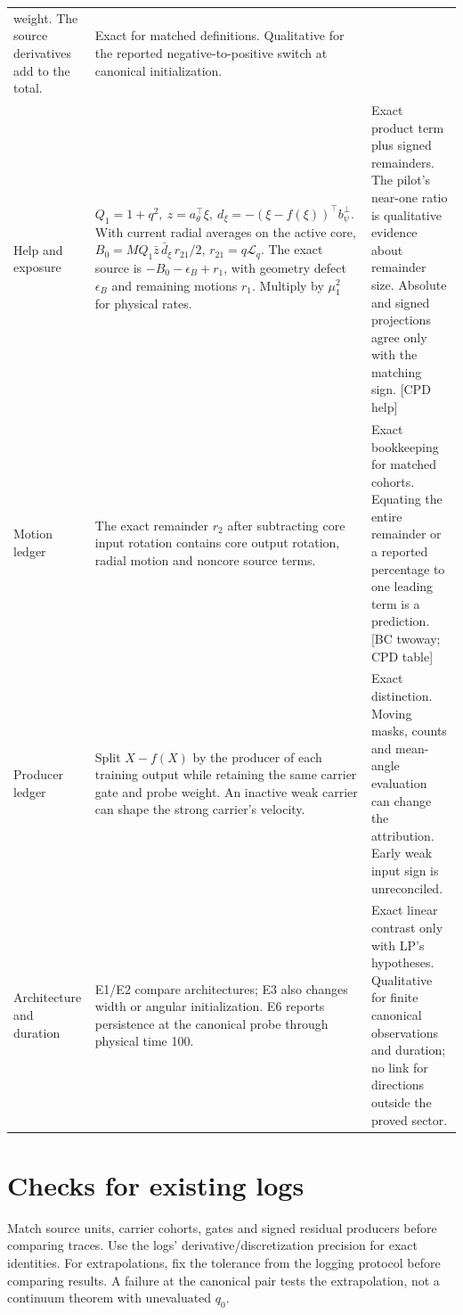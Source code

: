 \documentclass[10pt,twocolumn]{article}
\newcommand{\src}[1]{\textnormal{\small [#1]}}
\begin{document}
\begin{longtable}{@{}>{\raggedright\arraybackslash}p{}
 >{\raggedright\arraybackslash}p{}
 >{\raggedright\arraybackslash}p{}@{}}
weight. The source derivatives add to the total.
& Exact for matched definitions. Qualitative for the reported
negative-to-positive switch at canonical initialization.\\
Help and exposure & \(Q_1=1+q^2,\ z=a_\theta^\top\xi,\ 
d_\xi=-(\xi-f(\xi))^\top b_\psi^\perp\).
With current radial averages on the active core,
\(B_0=M Q_1\bar z\,\bar d_\xi\,r_{21}/2\), \(r_{21}=q\mathcal L_q\).
The exact source is \(-B_0-\epsilon_B+r_1\), with geometry defect \(\epsilon_B\) and remaining motions \(r_1\).
Multiply by \(\mu_1^2\) for physical rates. &
Exact product term plus signed remainders. The pilot's near-one
ratio is qualitative evidence about remainder size. Absolute and
signed projections agree only with the matching sign. \src{CPD help}\\
Motion ledger & The exact remainder \(r_2\) after subtracting core input
rotation contains core output rotation, radial motion and noncore
source terms. &
Exact bookkeeping for matched cohorts. Equating the entire remainder
or a reported percentage to one leading term is a prediction.
\src{BC twoway; CPD table}\\
Producer ledger & Split \(X-f(X)\) by the producer of each training
output while retaining the same carrier gate and probe weight.
An inactive weak carrier can shape the strong carrier's velocity. &
Exact distinction. Moving masks, counts and mean-angle evaluation
can change the attribution. Early weak input sign is unreconciled.\\
Architecture and duration & E1/E2 compare architectures; E3 also changes
width or angular initialization. E6 reports persistence at the
canonical probe through physical time 100. &
Exact linear contrast only with LP's hypotheses. Qualitative for finite
canonical observations and duration; no link for directions outside
the proved sector.\\
\bottomrule\end{longtable}\normalsize

\section{Checks for existing logs}\label{p1thv1:checks}
Match source units, carrier cohorts, gates and signed residual producers
before comparing traces. Use the logs' derivative/discretization precision
for exact identities. For extrapolations, fix the tolerance from the
logging protocol before comparing results. A failure at the canonical
pair tests the extrapolation, not a continuum theorem with unevaluated
\(q_0\).
\end{document}
